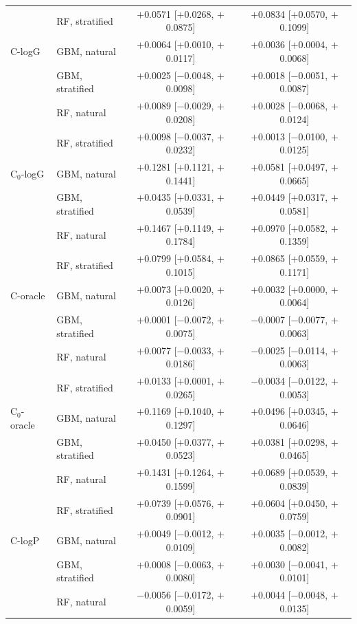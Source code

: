 \begin{longtable}{llcc}
 & RF, stratified & $+$0.0571 [$+$0.0268, $+$0.0875] & $+$0.0834 [$+$0.0570, $+$0.1099] \\
\addlinespace
C-logG & GBM, natural & $+$0.0064 [$+$0.0010, $+$0.0117] & $+$0.0036 [$+$0.0004, $+$0.0068] \\
 & GBM, stratified & $+$0.0025 [$-$0.0048, $+$0.0098] & $+$0.0018 [$-$0.0051, $+$0.0087] \\
 & RF, natural & $+$0.0089 [$-$0.0029, $+$0.0208] & $+$0.0028 [$-$0.0068, $+$0.0124] \\
 & RF, stratified & $+$0.0098 [$-$0.0037, $+$0.0232] & $+$0.0013 [$-$0.0100, $+$0.0125] \\
\addlinespace
C$_0$-logG & GBM, natural & $+$0.1281 [$+$0.1121, $+$0.1441] & $+$0.0581 [$+$0.0497, $+$0.0665] \\
 & GBM, stratified & $+$0.0435 [$+$0.0331, $+$0.0539] & $+$0.0449 [$+$0.0317, $+$0.0581] \\
 & RF, natural & $+$0.1467 [$+$0.1149, $+$0.1784] & $+$0.0970 [$+$0.0582, $+$0.1359] \\
 & RF, stratified & $+$0.0799 [$+$0.0584, $+$0.1015] & $+$0.0865 [$+$0.0559, $+$0.1171] \\
\addlinespace
C-oracle & GBM, natural & $+$0.0073 [$+$0.0020, $+$0.0126] & $+$0.0032 [$+$0.0000, $+$0.0064] \\
 & GBM, stratified & $+$0.0001 [$-$0.0072, $+$0.0075] & $-$0.0007 [$-$0.0077, $+$0.0063] \\
 & RF, natural & $+$0.0077 [$-$0.0033, $+$0.0186] & $-$0.0025 [$-$0.0114, $+$0.0063] \\
 & RF, stratified & $+$0.0133 [$+$0.0001, $+$0.0265] & $-$0.0034 [$-$0.0122, $+$0.0053] \\
\addlinespace
C$_0$-oracle & GBM, natural & $+$0.1169 [$+$0.1040, $+$0.1297] & $+$0.0496 [$+$0.0345, $+$0.0646] \\
 & GBM, stratified & $+$0.0450 [$+$0.0377, $+$0.0523] & $+$0.0381 [$+$0.0298, $+$0.0465] \\
 & RF, natural & $+$0.1431 [$+$0.1264, $+$0.1599] & $+$0.0689 [$+$0.0539, $+$0.0839] \\
 & RF, stratified & $+$0.0739 [$+$0.0576, $+$0.0901] & $+$0.0604 [$+$0.0450, $+$0.0759] \\
\addlinespace
C-logP & GBM, natural & $+$0.0049 [$-$0.0012, $+$0.0109] & $+$0.0035 [$-$0.0012, $+$0.0082] \\
 & GBM, stratified & $+$0.0008 [$-$0.0063, $+$0.0080] & $+$0.0030 [$-$0.0041, $+$0.0101] \\
 & RF, natural & $-$0.0056 [$-$0.0172, $+$0.0059] & $+$0.0044 [$-$0.0048, $+$0.0135] \\

\end{longtable}

